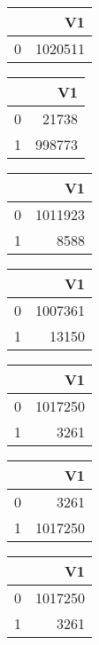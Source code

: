 \bigskip\bigskip
\centering
\begin{tabular}{rr}
  \hline
 & V1 \\ 
  \hline
0 & 1020511 \\ 
   \hline
\end{tabular}

\bigskip\bigskip
\centering
\begin{tabular}{rr}
  \hline
 & V1 \\ 
  \hline
0 & 21738 \\ 
  1 & 998773 \\ 
   \hline
\end{tabular}

\bigskip\bigskip
\centering
\begin{tabular}{rr}
  \hline
 & V1 \\ 
  \hline
0 & 1011923 \\ 
  1 & 8588 \\ 
   \hline
\end{tabular}

\bigskip\bigskip
\centering
\begin{tabular}{rr}
  \hline
 & V1 \\ 
  \hline
0 & 1007361 \\ 
  1 & 13150 \\ 
   \hline
\end{tabular}

\bigskip\bigskip
\centering
\begin{tabular}{rr}
  \hline
 & V1 \\ 
  \hline
0 & 1017250 \\ 
  1 & 3261 \\ 
   \hline
\end{tabular}

\bigskip\bigskip
\centering
\begin{tabular}{rr}
  \hline
 & V1 \\ 
  \hline
0 & 3261 \\ 
  1 & 1017250 \\ 
   \hline
\end{tabular}

\bigskip\bigskip
\centering
\begin{tabular}{rr}
  \hline
 & V1 \\ 
  \hline
0 & 1017250 \\ 
  1 & 3261 \\ 
   \hline
\end{tabular}

